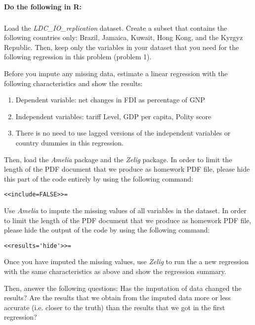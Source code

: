 \documentclass[12pt]{article}
\begin{document}
\paragraph{Do the following in R:}

\subparagraph{} Load the \textit{LDC\_IO\_replication} dataset. Create a subset that contains the following countries only: Brazil, Jamaica, Kuwait, Hong Kong, and the Kyrgyz Republic. Then, keep only the variables in your dataset that you need for the following regression in this problem (problem 1).

\bigskip

Before you impute any missing data, estimate a linear regression with the following characteristics and show the results:

\begin{enumerate}
	\item Dependent variable: net changes in FDI as percentage of GNP
	\item Independent variables: tariff Level, GDP per capita, Polity score
	\item There is no need to use lagged versions of the independent variables or country dummies in this regression.
\end{enumerate}

\bigskip

Then, load the \textit{Amelia} package and the \textit{Zelig} package. In order to limit the length of the PDF document that we produce as homework PDF file, please hide this part of the code entirely by using the following command:
\begin{verbatim}
<<include=FALSE>>=
\end{verbatim}

Use \textit{Amelia} to impute the missing values of all variables in the dataset. In order to limit the length of the PDF document that we produce as homework PDF file, please hide the output of the code by using the following command:
\begin{verbatim}
<<results='hide'>>=
\end{verbatim}

Once you have imputed the missing values, use \textit{Zelig} to run the a new regression with the same characteristics as above and show the regression summary.

Then, answer the following questions: Has the imputation of data changed the results? Are the results that we obtain from the imputed data more or less accurate (i.e. closer to the truth) than the results that we got in the first regression?
\end{document}
